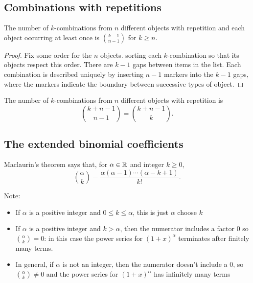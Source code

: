 \documentclass[10pt, a4paper]{article}
\begin{document}
\subsection{Combinations with repetitions}
\begin{theorem}
    The number of $k$-combinations from $n$ different objects with repetition and each object occurring at least once is $\binom{k - 1}{n - 1}$ for $k \geq n$.
    \begin{proof}
        Fix some order for the $n$ objects.
        sorting each $k$-combination so that its objects respect this order.
        There are $k - 1$ gaps between items in the list.
        Each combination is described uniquely by inserting $n - 1$ markers into the $k - 1$ gaps,
        where the markers indicate the boundary between successive types of object.
    \end{proof}
\end{theorem}

\begin{theorem}
    The number of $k$-combinations from $n$ different objects with repetition is
    \[
    \binom{k + n - 1}{n - 1} = \binom{k + n - 1}{k}.
    \]
\end{theorem}

\subsection{The extended binomial coefficients}

Maclaurin’s theorem says that, for $\alpha \in \mathbb{R}$ and integer $k \geq 0$,
\[
\binom{\alpha}{k} = \frac{\alpha(\alpha - 1)\dotsi (\alpha - k + 1)}{k!}.
\]

Note:
\begin{itemize}
    \item If $\alpha$ is a positive integer and $0 \leq k \leq \alpha$,
    this is just $\alpha$ choose $k$
    \item If $\alpha$ is a positive integer and $k > \alpha$,
    then the numerator includes a factor $0$ so $\binom{\alpha}{k} = 0$:
    in this case the power series for $(1 + x) ^ \alpha$ terminates after finitely many terms.
    \item In general,
    if $\alpha$ is not an integer, then the numerator doesn't include a $0$, so
    $\binom{\alpha}{k} \neq 0$ and the power series for $(1 + x) ^ \alpha$ has infinitely many terms
\end{itemize}
\end{document}
